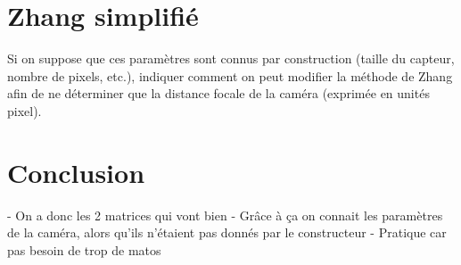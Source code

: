 \documentclass{article}
\begin{document}
\section{Zhang simplifié}

Si on suppose que ces paramètres sont connus par construction (taille du capteur, nombre de pixels, etc.), indiquer comment on peut modifier la méthode de Zhang afin de ne déterminer que la distance focale de la caméra (exprimée en unités pixel).




\section{Conclusion}

- On a donc les 2 matrices qui vont bien
- Grâce à ça on connait les paramètres de la caméra, alors qu'ils n'étaient pas donnés par le constructeur
- Pratique car pas besoin de trop de matos

\end{document}
